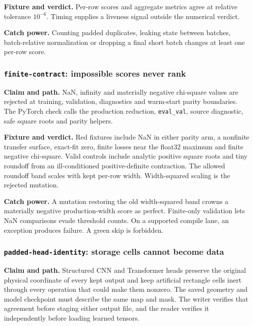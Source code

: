\documentclass[10pt,aps,prd,twocolumn,nofootinbib]{revtex4-2}
\newcommand{\code}[1]{\texttt{#1}}
\begin{document}
\textbf{Fixture and verdict.}  Per-row scores and aggregate metrics agree at
relative tolerance \(10^{-6}\).  Timing supplies a liveness signal outside the
numerical verdict.

\textbf{Catch power.}  Counting padded duplicates, leaking state between
batches, batch-relative normalization or dropping a final short batch
changes at least one per-row score.

\subsubsection{\code{finite-contract}: impossible scores never rank}

\textbf{Claim and path.}  NaN, infinity and materially negative chi-square
values are rejected at training, validation, diagnostics and warm-start
parity boundaries.  The PyTorch check calls the production reduction,
\code{eval\_val}, source diagnostic, safe square roots and parity helpers.

\textbf{Fixture and verdict.}  Red fixtures include NaN in either parity arm,
a nonfinite transfer surface, exact-fit zero, finite losses near the float32
maximum and finite negative chi-square.  Valid controls include analytic
positive square roots and tiny roundoff from an ill-conditioned
positive-definite contraction.  The allowed roundoff band scales with kept
per-row width.  Width-squared scaling is the rejected mutation.

\textbf{Catch power.}  A mutation restoring the old width-squared band crowns
a materially negative production-width score as perfect.  Finite-only
validation lets NaN comparisons evade threshold counts.  On a supported
compile lane, an exception produces failure.  A green skip is forbidden.

\subsubsection{\code{padded-head-identity}: storage cells cannot become data}

\textbf{Claim and path.}  Structured CNN and Transformer heads preserve the
original physical coordinate of every kept output and keep artificial
rectangle cells inert through every operation that could make them nonzero.
The saved geometry and model checkpoint must describe the same map and mask.
The writer verifies that agreement before staging either output file, and the
reader verifies it independently before loading learned tensors.
\end{document}
